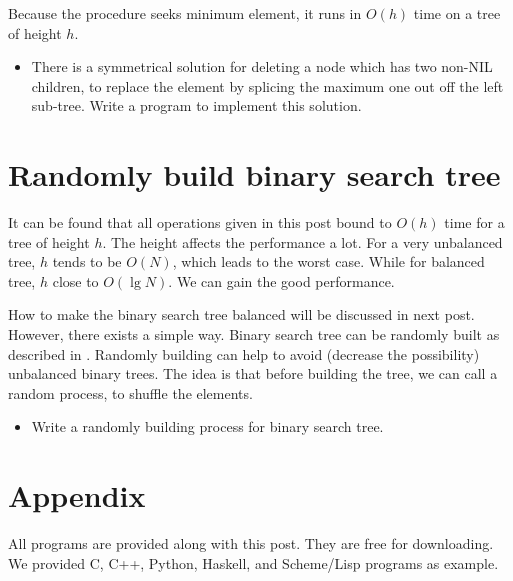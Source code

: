 \documentclass[UTF8]{article}
\begin{document}
Because the procedure seeks minimum element, it runs in $O(h)$ time on
a tree of height $h$.

\begin{Exercise}

\begin{itemize}
\item There is a symmetrical solution for deleting a node which has two
non-NIL children, to replace the element by splicing the maximum one out
off the left sub-tree. Write a program to implement this solution.
\end{itemize}

\end{Exercise}

\section{Randomly build binary search tree}
It can be found that all operations given in this post bound to $O(h)$
time for a tree of height $h$. The height affects the performance
a lot. For a very unbalanced tree, $h$ tends to be $O(N)$, which leads
to the worst case. While for balanced tree, $h$ close to $O(\lg N)$.
We can gain the good performance.

How to make the binary search tree
balanced will be discussed in next post. However, there exists a simple
way. Binary search tree can be randomly built as described in \cite{CLRS}.
Randomly building can help to avoid (decrease the possibility) unbalanced
binary trees. The idea is that before building the tree, we can call a random
process, to shuffle the elements.

\begin{Exercise}

\begin{itemize}
\item Write a randomly building process for binary search tree.
\end{itemize}

\end{Exercise}

\section{Appendix} \label{appendix}
All programs are provided along with this post. They are free for downloading.
We provided C, C++, Python, Haskell, and Scheme/Lisp programs as example.
\end{document}
